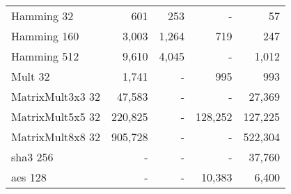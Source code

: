 \begin{table}
\begin{tabular}{l||r|r|r||r}
Hamming 32       & 601                                                  & 253                                                            & -                                                     & 57                                                   \\
Hamming 160      & 3,003                                                & 1,264                                                          & 719                                                   & 247                                                  \\
Hamming 512      & 9,610                                                & 4,045                                                          & -                                                     & 1,012                                                \\ \hline
Mult 32          & 1,741                                                & -                                                              & 995                                                   & 993                                                  \\ \hline
MatrixMult3x3 32 & 47,583                                               & -                                                              & -                                                     & 27,369                                               \\
MatrixMult5x5 32 & 220,825                                              & -                                                              & 128,252                                               & 127,225                                              \\
MatrixMult8x8 32 & 905,728                                              & -                                                              & -                                                     & 522,304                                              \\ \hline
\acrshort{sha}3 256         & -                                                    & -                                                              & -                                                     & 37,760                                               \\ \hline
\acrshort{aes} 128          & -                                                    & -                                                              & 10,383                                                & 6,400
\end{tabular}
\end{table}

